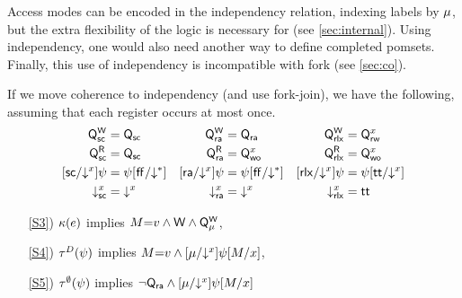 Access modes can be encoded in the independency relation, indexing labels by
$\mu$, but the extra flexibility of the logic is necessary for \armeight{}
(see \textsection\ref{sec:internal}).  Using independency, one would also
need another way to define completed pomsets.  Finally, this use of
independency is incompatible with fork (see \textsection\ref{sec:co}).


If we move coherence to independency (and use fork-join), we have the
following, assuming that each register occurs at most once.
\begin{align*}
  \smash{\mathsf{Q}_{{\mathsf{sc}}}^{\mathsf{W}}}&=\mathsf{Q}_{{\mathsf{sc}}}
  &\smash{\mathsf{Q}_{{\mathsf{ra}}}^{\mathsf{W}}}&=\mathsf{Q}_{{\mathsf{ra}}}
  &\smash{\mathsf{Q}_{{\mathsf{rlx}}}^{\mathsf{W}}}&=\mathsf{Q}_{\mathsf{rw}}^{x}
  \\
  \smash{\mathsf{Q}_{{\mathsf{sc}}}^{\mathsf{R}}}&=\mathsf{Q}_{{\mathsf{sc}}}
  &\smash{\mathsf{Q}_{{\mathsf{ra}}}^{\mathsf{R}}}&=\mathsf{Q}_{\mathsf{wo}}^{x}
  &\smash{\mathsf{Q}_{{\mathsf{rlx}}}^{\mathsf{R}}}&=\mathsf{Q}_{\mathsf{wo}}^{x}
  \\
  {[}{{\mathsf{sc}}}/\mathord{\downarrow^{x}}{]}{\psi}&=\psi[\mkern.6mu\mathsf{ff}\mkern.6mu/\mathord{\downarrow^{\mathtt{*}}}]
  &{[}{{\mathsf{ra}}}/\mathord{\downarrow^{x}}{]}{\psi}&=\psi[\mkern.6mu\mathsf{ff}\mkern.6mu/\mathord{\downarrow^{\mathtt{*}}}]
  &{[}{{\mathsf{rlx}}}/\mathord{\downarrow^{x}}{]}{\psi}&=\psi[\mathsf{tt}/\mathord{\downarrow^{x}}] 
  \\
  \mathord{\downarrow^{x}_{{\mathsf{sc}}}}&=\mathord{\downarrow^{x}}
  &\mathord{\downarrow^{x}_{{\mathsf{ra}}}}&=\mathord{\downarrow^{x}}
  &\mathord{\downarrow^{x}_{{\mathsf{rlx}}}}&=\mathsf{tt}
\end{align*}







\noindent
\begin{enumerate}
\item[\ref{S3})]
  $\kappa(e)$ implies
  \begin{math}
    M{=}v
    \land \mathsf{W}
    \land \smash{\mathsf{Q}_{\mu}^{\mathsf{W}}}
  \end{math},
\item[\ref{S4})]
  $\aTr{\bEvs}{\bForm}$ implies 
  \begin{math}
    M{=}v
    \land {[}{\mu}/\mathord{\downarrow^{x}}{]}{\psi[M/{x}]}
  \end{math},
\item[\ref{S5})]
  $\aTr{\emptyset}{\bForm}$ implies 
  \begin{math}
    \lnot\mathsf{Q}_{{\mathsf{ra}}}
    \land {[}{\mu}/\mathord{\downarrow^{x}}{]}{\psi[M/{x}]}
  \end{math}
\end{enumerate}

